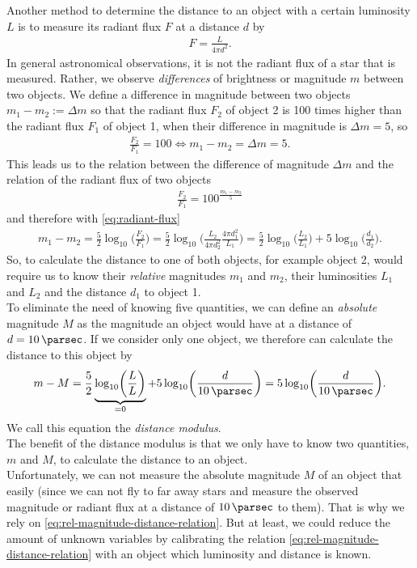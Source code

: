 Another method to determine the distance to an object with a certain luminosity $L$ is to measure its radiant flux $F$ at a distance $d$ by
\begin{align}
    F = \frac{L}{4\pi d^2}. \label{eq:radiant-flux} 
\end{align}
In general astronomical observations, it is not the radiant flux of a star that is measured. Rather, we observe \textit{differences} of brightness or magnitude $m$ between two objects. We define a difference in magnitude between two objects $m_{1} - m_{2} := \Delta m$ so that the radiant flux $F_{2}$ of object 2 is 100 times higher than the radiant flux $F_{1}$ of object 1, when their difference in magnitude is $\Delta m = 5$, so 
\begin{align}
    \frac{F_{2}}{F_{1}} = 100 \Leftrightarrow m_{1} - m_{2} = \Delta m = 5.
\end{align}
This leads us to the relation between the difference of magnitude $\Delta m$ and the relation of the radiant flux of two objects
\begin{align}
    \frac{F_{2}}{F_{1}} = 100^{\frac{m_{1} - m_{2}}{5}} 
\end{align}
and therefore with \eqref{eq:radiant-flux}
\begin{align}
    m_{1} - m_{2} = \frac{5}{2} \log_{10} \biggl( \frac{F_{2}}{F_{1}} \biggr) = \frac{5}{2} \log_{10} \biggl( \frac{L_{2}}{4\pi d_{2}^2} \frac{4\pi d_{1}^2}{L_{1}} \biggr) = \frac{5}{2} \log_{10} \biggl( \frac{L_{2}}{L_{1}} \biggr) + 5 \log_{10} \biggl( \frac{d_{1}}{d_{2}} \biggr). \label{eq:rel-magnitude-distance-relation} 
\end{align}
So, to calculate the distance to one of both objects, for example object 2, would require us to know their \textit{relative} magnitudes $m_{1}$ and $m_{2}$, their luminosities $L_{1}$ and $L_{2}$ and the distance $d_{1}$ to object 1. \\
To eliminate the need of knowing five quantities, we can define an \textit{absolute} magnitude $M$ as the magnitude an object would have at a distance of $d = \SI{10}{\parsec}$. If we consider only one object, we therefore can calculate the distance to this object by
\begin{align}
    m - M = \frac{5}{2} \underbrace{\log_{10} \biggl( \frac{L}{L} \biggr)}_{ = 0} + 5 \log_{10} \biggl( \frac{d}{\SI{10}{\parsec}} \biggr) = 5 \log_{10} \biggl(\frac{d}{\SI{10}{\parsec}}\biggr). \label{eq:distance-modulus} 
\end{align}
We call this equation the \textit{distance modulus}. \\
The benefit of the distance modulus is that we only have to know two quantities, $m$ and $M$, to calculate the distance to an object. \\
Unfortunately, we can not measure the absolute magnitude $M$ of an object that easily (since we can not fly to far away stars and measure the observed magnitude or radiant flux at a distance of $\SI{10}{\parsec}$ to them). That is why we rely on \eqref{eq:rel-magnitude-distance-relation}.
But at least, we could reduce the amount of unknown variables by calibrating the relation \eqref{eq:rel-magnitude-distance-relation} with an object which luminosity and distance is known. \\

